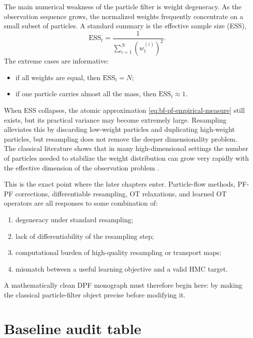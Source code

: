 The main numerical weakness of the particle filter is weight degeneracy.  As the
observation sequence grows, the normalized weights frequently concentrate on a
small subset of particles.  A standard summary is the effective sample size
(ESS),
\begin{equation}
\label{eq:bf-pf-ess}
  \mathrm{ESS}_t = \frac{1}{\sum_{i=1}^N (w_t^{(i)})^2}.
\end{equation}
The extreme cases are informative:
\begin{itemize}
  \item if all weights are equal, then $\mathrm{ESS}_t=N$;
  \item if one particle carries almost all the mass, then
    $\mathrm{ESS}_t \approx 1$.
\end{itemize}
When ESS collapses, the atomic approximation
\eqref{eq:bf-pf-empirical-measure} still exists, but its practical variance may
become extremely large.  Resampling alleviates this by discarding low-weight
particles and duplicating high-weight particles, but resampling does not remove
the deeper dimensionality problem.  The classical literature shows that in many
high-dimensional settings the number of particles needed to stabilize the weight
distribution can grow very rapidly with the effective dimension of the
observation problem \citep{bengtsson2008curse,snyder2008obstacles}.

This is the exact point where the later chapters enter.  Particle-flow methods,
PF-PF corrections, differentiable resampling, OT relaxations, and learned OT
operators are all responses to some combination of:
\begin{enumerate}[label=(\roman*)]
  \item degeneracy under standard resampling;
  \item lack of differentiability of the resampling step;
  \item computational burden of high-quality resampling or transport maps;
  \item mismatch between a useful learning objective and a valid HMC target.
\end{enumerate}
A mathematically clean DPF monograph must therefore begin here: by making the
classical particle-filter object precise before modifying it.

\section{Baseline audit table}
\label{sec:bf-pf-audit-table}

